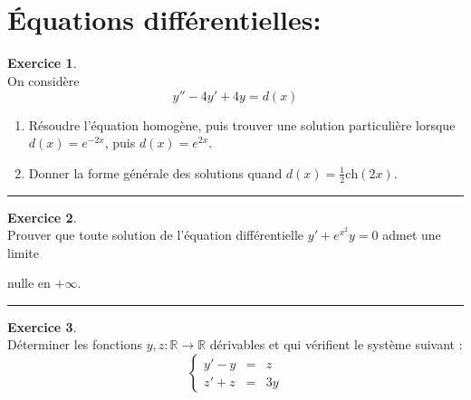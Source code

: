 \documentclass[a4paper,11pt]{article}
\theoremstyle{definition}
\newtheorem{exo}{Exercice} %
\begin{document}
\hfill\\\hfill\\
\begin{minipage}{1\linewidth}
	\begin{minipage}[t]{0.48\linewidth}
		\raggedright
		\section*{Équations différentielles:}
		
		
		
		
		
		\begin{exo}\textit{ }\quad\\[0.25cm]
					On considère $$y''-4y'+4y=d(x)$$ 
			\begin{enumerate}
				\item Résoudre l'équation homogène, puis trouver une solution particulière 
				lorsque $d(x)=e^{-2x}$, puis $d(x)=e^{2x}$.
				\item Donner la forme générale des solutions quand $d(x)=\frac{1}{2} \text{ch}(2x)$.	
			\end{enumerate}
			 
			
			
			
			\centering
			\rule{1\linewidth}{0.6pt}
		\end{exo}
		
		
		
		\begin{exo}\textit{}\quad\\
			Prouver que toute solution de l'équation différentielle $y'+e^{x^2}y =0$ admet une limite
			
			 nulle en $+\infty$.
			
			\centering
			\rule{1\linewidth}{0.6pt}
		\end{exo}
		
		\begin{exo}\quad\\
			Déterminer les fonctions $y,z:\mathbb R\to\mathbb R$ dérivables et qui vérifient le système suivant :
			$$
			\left\{
			\begin{array}{rcl}
			y'-y&=&z\\
			z'+z&=&3y
			\end{array}
			\right.$$
			

\end{exo}
\end{minipage}
\end{minipage}
\end{document}
